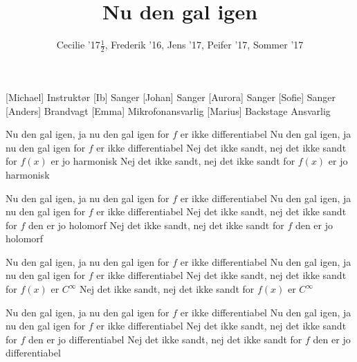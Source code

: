 \documentclass[a4paper,11pt]{article}
\title{Nu den gal igen}
\author{Cecilie '17$\frac{1}{2}$, Frederik '16, Jens '17, Peifer '17, Sommer '17}
\begin{document}
\maketitle

\begin{roles}
[Michael] Instruktør
[Ib] Sanger
[Johan] Sanger
[Aurora] Sanger
[Sofie] Sanger
[Anders] Brandvagt
[Emma] Mikrofonansvarlig
[Marius] Backstage Ansvarlig
\end{roles}

\begin{song}
   Nu den gal igen, ja nu den gal igen
for $f$ er ikke differentiabel
Nu den gal igen, ja nu den gal igen
for $f$ er ikke differentiabel
  Nej det ikke sandt, nej det ikke sandt
for $f(x)$ er jo harmonisk
Nej det ikke sandt, nej det ikke sandt
for $f(x)$ er jo harmonisk

 Nu den gal igen, ja nu den gal igen
for $f$ er ikke differentiabel
Nu den gal igen, ja nu den gal igen
for $f$ er ikke differentiabel
  Nej det ikke sandt, nej det ikke sandt
for $f$ den er jo holomorf
Nej det ikke sandt, nej det ikke sandt
for $f$ den er jo holomorf 

 Nu den gal igen, ja nu den gal igen
for $f$ er ikke differentiabel
Nu den gal igen, ja nu den gal igen
for $f$ er ikke differentiabel
  Nej det ikke sandt, nej det ikke sandt
for $f(x)$ er $C^{\infty}$
Nej det ikke sandt, nej det ikke sandt
for $f(x)$ er $C^{\infty}$

 Nu den gal igen, ja nu den gal igen
for $f$ er ikke differentiabel
Nu den gal igen, ja nu den gal igen
for $f$ er ikke differentiabel
  Nej det ikke sandt, nej det ikke sandt
for $f$ den er jo differentiabel
Nej det ikke sandt, nej det ikke sandt
for $f$ den er jo differentiabel

\end{song}
\end{document}
